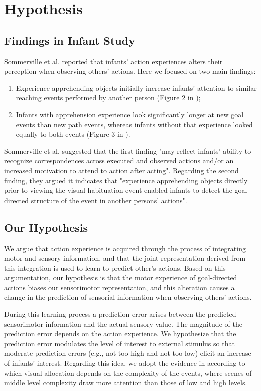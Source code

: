 \documentclass[conference]{IEEEtran}
\begin{document}
\section{Hypothesis}
 
\subsection{Findings in Infant Study}
Sommerville et al. \cite{sommerville2005action} reported that infants' action experiences alters their perception when observing others' actions. Here we focused on two main findings:
 
\begin{enumerate}
\item Experience apprehending objects initially increase infants’ attention to similar reaching events performed by another person (Figure 2 in \cite{sommerville2005action});
\item Infants with apprehension experience look significantly longer at new goal events than new path events, whereas infants without that experience looked equally to both events (Figure 3 in \cite{sommerville2005action}).
\end{enumerate}
 
Sommerville et al. \cite{sommerville2005action} suggested that the first finding "may reflect infants’ ability to recognize correspondences across executed and observed actions and/or an increased motivation to attend to action after acting". Regarding the second finding, they argued it indicates that "experience apprehending objects directly prior to viewing the visual habituation event enabled infants to detect the goal-directed structure of the event in another persons' actions".
 
\subsection{Our Hypothesis}
We argue that action experience is acquired through the process of integrating motor and sensory information, and that the joint representation derived from this integration is used to learn to predict other's actions. Based on this argumentation, our hypothesis is that the motor experience of goal-directed actions biases our sensorimotor representation, and this alteration causes a change in the prediction of sensorial information when observing others' actions.

During this learning process a prediction error arises between the predicted sensorimotor information and the actual sensory value. The magnitude of the prediction error depends on the action experience. We hypothesize that the prediction error modulates the level of interest to external stimulus so that moderate prediction errors (e.g., not too high and not too low) elicit an increase of infants’ interest. Regarding this idea, we adopt the evidence in \cite{kidd2012goldilocks} according to which visual allocation depends on the complexity of the events, where scenes of middle level complexity draw more attention than those of low and high levels.
\end{document}
